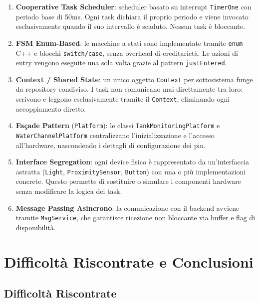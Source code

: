 \documentclass[12pt, a4paper]{article}
\begin{document}
\begin{enumerate}
    \item \textbf{Cooperative Task Scheduler}: scheduler basato su interrupt \texttt{TimerOne} con periodo base di 50ms. Ogni task dichiara il proprio periodo e viene invocato esclusivamente quando il suo intervallo è scaduto. Nessun task è bloccante.

    \item \textbf{FSM Enum-Based}: le macchine a stati sono implementate tramite \texttt{enum} C++ e blocchi \texttt{switch/case}, senza overhead di ereditarietà. Le azioni di entry vengono eseguite una sola volta grazie al pattern \texttt{justEntered}.

    \item \textbf{Context / Shared State}: un unico oggetto \texttt{Context} per sottosistema funge da repository condiviso. I task non comunicano mai direttamente tra loro: scrivono e leggono esclusivamente tramite il \texttt{Context}, eliminando ogni accoppiamento diretto.

    \item \textbf{Façade Pattern} (\texttt{Platform}): le classi \texttt{TankMonitoringPlatform} e \texttt{WaterChannelPlatform} centralizzano l'inizializzazione e l'accesso all'hardware, nascondendo i dettagli di configurazione dei pin.

    \item \textbf{Interface Segregation}: ogni device fisico è rappresentato da un'interfaccia astratta (\texttt{Light}, \texttt{ProximitySensor}, \texttt{Button}) con una o più implementazioni concrete. Questo permette di sostituire o simulare i componenti hardware senza modificare la logica dei task.

    \item \textbf{Message Passing Asincrono}: la comunicazione con il backend avviene tramite \texttt{MsgService}, che garantisce ricezione non bloccante via buffer e flag di disponibilità.
\end{enumerate}

\section{Difficoltà Riscontrate e Conclusioni}

\subsection{Difficoltà Riscontrate}
\end{document}
